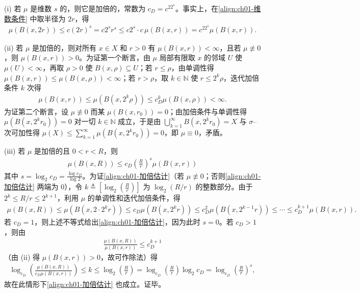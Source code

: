 \documentclass[../../main.tex]{subfiles}%
\begin{document}
\begin{remark}\label{remark:ch01-加倍性质}
(i) 若 $\mu$ 是维数 $s$ 的，则它是加倍的，常数为 $c_D=c^22^s$。事实上，在\eqref{align:ch01-维数条件} 中取半径为 $2r$，得
\begin{align*}
\mu(B(x,2r))\leqslant c(2r)^s=c2^sr^s\leqslant c2^s\cdot c\,\mu(B(x,r))=c^22^s\mu(B(x,r)).
\end{align*}

(ii) 若 $\mu$ 是加倍的，则对所有 $x\in X$ 和 $r>0$ 有 $\mu(B(x,r))<\infty$，且若 $\mu\not\equiv0$，则 $\mu(B(x,r))>0$。为证第一个断言，由 $\mu$ 局部有限取 $x$ 的邻域 $U$ 使 $\mu(U)<\infty$，再取 $\rho>0$ 使 $B(x,\rho)\subseteq U$；若 $r\leqslant\rho$，由单调性得 $\mu(B(x,r))\leqslant\mu(B(x,\rho))<\infty$；若 $r>\rho$，取 $k\in\mathbb{N}$ 使 $r\leqslant2^k\rho$，迭代加倍条件 $k$ 次得
\begin{align*}
\mu(B(x,r))\leqslant\mu(B(x,2^k\rho))\leqslant c_D^k\mu(B(x,\rho))<\infty.
\end{align*}
为证第二个断言，设 $\mu\not\equiv0$ 而某 $\mu(B(x,r_0))=0$；由加倍条件与单调性得 $\mu(B(x,2^kr_0))=0$ 对一切 $k\in\mathbb{N}$ 成立，于是由 $\bigcup_{k=1}^\infty B(x,2^kr_0)=X$ 与 $\sigma$--次可加性得 $\mu(X)\leqslant\sum_{k=1}^\infty\mu(B(x,2^kr_0))=0$，即 $\mu\equiv0$，矛盾。

(iii) 若 $\mu$ 是加倍的且 $0<r<R$，则
\begin{align}
\mu(B(x,R))\leqslant c_D\left(\frac{R}{r}\right)^s\mu(B(x,r)) \label{align:ch01-加倍估计}
\end{align}
其中 $s=\log_2c_D=\frac{\log c_D}{\log2}$。为证\eqref{align:ch01-加倍估计}（若 $\mu\not\equiv0$；否则\eqref{align:ch01-加倍估计} 两端为 $0$），令 $k\triangleq\left[\log_2\left(\frac{R}{r}\right)\right]$ 为 $\log_2(R/r)$ 的整数部分。由于 $2^k\leqslant R/r\leqslant2^{k+1}$，利用 $\mu$ 的单调性和迭代加倍条件，得
\begin{align*}
\mu(B(x,R))\leqslant\mu(B(x,2\cdot2^kr))\leqslant c_D\mu(B(x,2^kr))
\leqslant c_D^2\mu(B(x,2^{k-1}r))\leqslant\cdots\leqslant c_D^{k+1}\mu(B(x,r)).
\end{align*}
若 $c_D=1$，则上述不等式给出\eqref{align:ch01-加倍估计}，因为此时 $s=0$。若 $c_D>1$，则由
\begin{align*}
\frac{\mu(B(x,R))}{\mu(B(x,r))}\leqslant c_D^{k+1}
\end{align*}
（由 (ii) 得 $\mu(B(x,r))>0$，故可作除法）得
\begin{align*}
\log_{c_D}\left(\frac{\mu(B(x,R))}{c_D\mu(B(x,r))}\right)\leqslant k\leqslant\log_2\left(\frac{R}{r}\right)
=\log_{c_D}\left(\frac{R}{r}\right)\log_2c_D
=\log_{c_D}\left(\frac{R}{r}\right)^s,
\end{align*}
故在此情形下\eqref{align:ch01-加倍估计} 也成立。证毕。
\end{remark}
\end{document}
